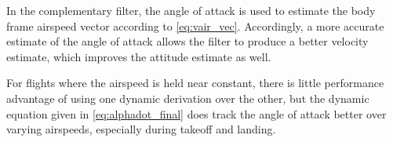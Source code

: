 In the complementary filter, the angle of attack is used to estimate the body frame airspeed vector according to \eqref{eq:vair_vec}.
Accordingly, a more accurate estimate of the angle of attack allows the filter to produce a better velocity estimate, which improves the attitude estimate as well. 

For flights where the airspeed is held near constant, there is little performance advantage of using one dynamic derivation over the other, but the dynamic equation given in \eqref{eq:alphadot_final} does track the angle of attack better over varying airspeeds, especially during takeoff and landing.
%

